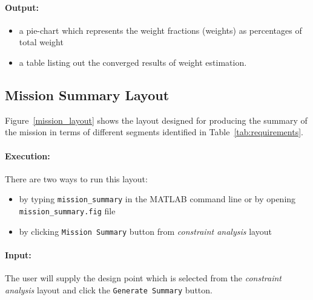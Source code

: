 \documentclass[pdftex,11pt,letter]{article}
\begin{document}
\paragraph{Output:}
\begin{itemize}
\item  a pie-chart which represents the weight fractions (weights) as percentages of total weight
\item a table listing out the converged results of weight estimation. 
\end{itemize}

\subsection{Mission Summary Layout}
Figure~\ref{mission_layout} shows the layout designed for producing the summary of the mission in terms of different segments identified in Table~\ref{tab:requirements}. 
\paragraph{Execution:}
There are two ways to run this layout:
\begin{itemize}
\item by typing \texttt{mission\_summary} in the MATLAB command line or by opening \texttt{mission\_summary.fig} file
\item by clicking \texttt{Mission Summary} button from \textit{constraint analysis} layout
\end{itemize}
\paragraph{Input:}
The user will supply the design point which is selected from the \textit{constraint analysis} layout and click the \texttt{Generate Summary} button.
\end{document}

